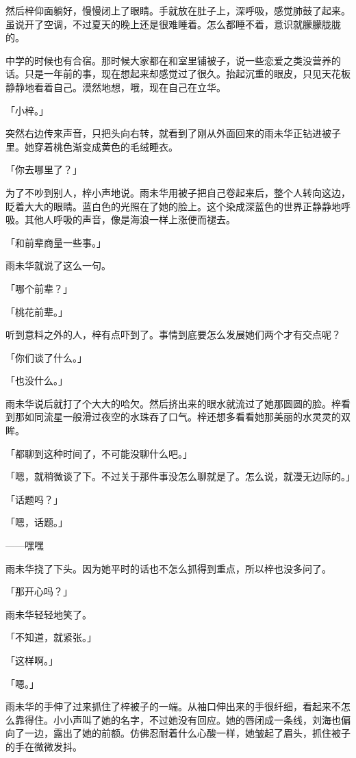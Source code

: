 \documentclass[UTF8]{ctexart}
\begin{document}
    然后梓仰面躺好，慢慢闭上了眼睛。手就放在肚子上，深呼吸，感觉肺鼓了起来。虽说开了空调，不过夏天的晚上还是很难睡着。怎么都睡不着，意识就朦朦胧胧的。

    中学的时候也有合宿。那时候大家都在和室里铺被子，说一些恋爱之类没营养的话。只是一年前的事，现在想起来却感觉过了很久。抬起沉重的眼皮，只见天花板静静地看着自己。漠然地想，哦，现在自己在立华。

    「小梓。」

    突然右边传来声音，只把头向右转，就看到了刚从外面回来的雨未华正钻进被子里。她穿着桃色渐变成黄色的毛绒睡衣。

    「你去哪里了？」

    为了不吵到别人，梓小声地说。雨未华用被子把自己卷起来后，整个人转向这边，眨着大大的眼睛。蓝白色的光照在了她的脸上。这个染成深蓝色的世界正静静地呼吸。其他人呼吸的声音，像是海浪一样上涨便而褪去。

    「和前辈商量一些事。」

    雨未华就说了这么一句。

    「哪个前辈？」

    「桃花前辈。」

    听到意料之外的人，梓有点吓到了。事情到底要怎么发展她们两个才有交点呢？

    「你们谈了什么。」

    「也没什么。」

    雨未华说后就打了个大大的哈欠。然后挤出来的眼水就流过了她那圆圆的脸。梓看到那如同流星一般滑过夜空的水珠吞了口气。梓还想多看看她那美丽的水灵灵的双眸。

    「都聊到这种时间了，不可能没聊什么吧。」

    「嗯，就稍微谈了下。不过关于那件事没怎么聊就是了。怎么说，就漫无边际的。」

    「话题吗？」

    「嗯，话题。」

    ——嘿嘿

    雨未华挠了下头。因为她平时的话也不怎么抓得到重点，所以梓也没多问了。

    「那开心吗？」

    雨未华轻轻地笑了。

    「不知道，就紧张。」

    「这样啊。」

    「嗯。」

    雨未华的手伸了过来抓住了梓被子的一端。从袖口伸出来的手很纤细，看起来不怎么靠得住。小小声叫了她的名字，不过她没有回应。她的唇闭成一条线，刘海也偏向了一边，露出了她的前额。仿佛忍耐着什么心酸一样，她皱起了眉头，抓住被子的手在微微发抖。
\end{document}
